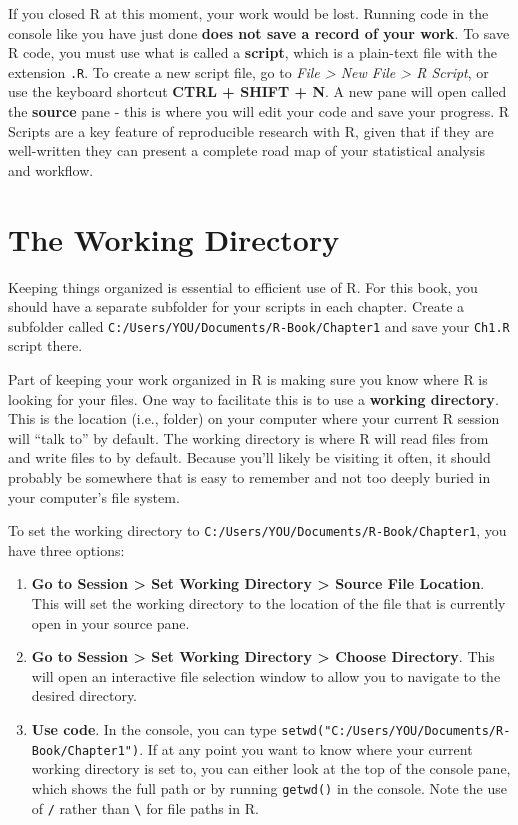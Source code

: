 \documentclass[]{book}
\theoremstyle{definition}
\theoremstyle{definition}
\theoremstyle{definition}
\theoremstyle{remark}
\begin{document}
If you closed R at this moment, your work would be lost. Running code in
the console like you have just done \textbf{does not save a record of
your work}. To save R code, you must use what is called a
\textbf{script}, which is a plain-text file with the extension
\texttt{.R}. To create a new script file, go to \emph{File
\textgreater{} New File \textgreater{} R Script}, or use the keyboard
shortcut \textbf{CTRL + SHIFT + N}. A new pane will open called the
\textbf{source} pane - this is where you will edit your code and save
your progress. R Scripts are a key feature of reproducible research with
R, given that if they are well-written they can present a complete road
map of your statistical analysis and workflow.

\section{The Working Directory}\label{working-dir}

Keeping things organized is essential to efficient use of R. For this
book, you should have a separate subfolder for your scripts in each
chapter. Create a subfolder called
\texttt{C:/Users/YOU/Documents/R-Book/Chapter1} and save your
\texttt{Ch1.R} script there.

Part of keeping your work organized in R is making sure you know where R
is looking for your files. One way to facilitate this is to use a
\textbf{working directory}. This is the location (i.e., folder) on your
computer where your current R session will ``talk to'' by default. The
working directory is where R will read files from and write files to by
default. Because you'll likely be visiting it often, it should probably
be somewhere that is easy to remember and not too deeply buried in your
computer's file system.

To set the working directory to
\texttt{C:/Users/YOU/Documents/R-Book/Chapter1}, you have three options:

\begin{enumerate}
\def\labelenumi{\arabic{enumi}.}
\item
  \textbf{Go to Session \textgreater{} Set Working Directory
  \textgreater{} Source File Location}. This will set the working
  directory to the location of the file that is currently open in your
  source pane.
\item
  \textbf{Go to Session \textgreater{} Set Working Directory
  \textgreater{} Choose Directory}. This will open an interactive file
  selection window to allow you to navigate to the desired directory.
\item
  \textbf{Use code}. In the console, you can type
  \texttt{setwd("C:/Users/YOU/Documents/R-Book/Chapter1")}. If at any
  point you want to know where your current working directory is set to,
  you can either look at the top of the console pane, which shows the
  full path or by running \texttt{getwd()} in the console. Note the use
  of \texttt{/} rather than \texttt{\textbackslash{}} for file paths in
  R.
\end{enumerate}
\end{document}
